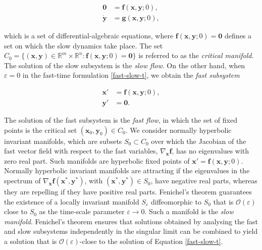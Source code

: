 \documentclass[aps,reprint,prx]{revtex4-2}
\begin{document}
\begin{equation} \label{slow-subsystem}
    \begin{aligned}
        \mathbf{0} &= \mathbf{f}(\mathbf{x},\mathbf{y};0), \\
        \dot{\mathbf{y}} &= \mathbf{g}(\mathbf{x},\mathbf{y};0), 
    \end{aligned}
\end{equation}

which is a set of differential-algebraic equations, where $\mathbf{f}(\mathbf{x},\mathbf{y};0) = \mathbf{0}$ defines a set on which the slow dynamics take place. The set $C_0 = \{(\mathbf{x},\mathbf{y}) \in \mathbb{R}^m \times \mathbb{R}^n:\mathbf{f}(\mathbf{x},\mathbf{y};0) = \mathbf{0}\}$ is referred to as the \textit{critical manifold}.
The solution of the slow subsystem is the \textit{slow flow}. On the other hand, when $\varepsilon=0$ in the fast-time formulation \eqref{fast-slow-t}, we obtain the \textit{fast subsystem}

\begin{equation} \label{fast-subsystem}
    \begin{aligned}
        \mathbf{x}' &= \mathbf{f}(\mathbf{x},\mathbf{y};0),\\
        \mathbf{y}' &= \mathbf{0}.
    \end{aligned}
\end{equation}

The solution of the fast subsystem is the \textit{fast flow}, in which the set of fixed points is the critical set $(\mathbf{x}_0,\mathbf{y}_0) \in C_0$. 
We consider normally hyperbolic invariant manifolds, which are subsets $S_0 \subset C_0$ over which the Jacobian of the fast vector field with respect to the fast variables, $\nabla_\mathbf{x}\mathbf{f}$, has no eigenvalues with zero real part. Such manifolds are hyperbolic fixed points of $\mathbf{x}' = \mathbf{f}(\mathbf{x},\mathbf{y};0)$. Normally hyperbolic invariant manifolds are attracting if the eigenvalues in the spectrum of $\nabla_\mathbf{x}\mathbf{f}(\mathbf{x}^*,\mathbf{y}^*)$, with $(\mathbf{x}^*,\mathbf{y}^*)\in S_0$, have negative real parts, whereas they are repelling if they {have positive real parts}. 
Fenichel's theorem \cite{fenichelGeometricSingularPerturbation1979, kuehnMathematicalFrameworkCritical2011, kuehnMultipleTimeScale2015} guarantees the existence of a locally invariant manifold $S_{\varepsilon}$ diffeomorphic to $S_0$ that is $\mathcal{O}(\varepsilon)$ close to $S_0$ as the time-scale parameter $\varepsilon \to 0$. Such a manifold is the \textit{slow manifold}. Fenichel's theorem ensures that solutions obtained by analysing the fast and slow subsystems independently in the singular limit can be combined to yield a solution that is 
$\mathcal{O}(\varepsilon)$-close to {the solution of Equation \eqref{fast-slow-t}}.
\end{document}
